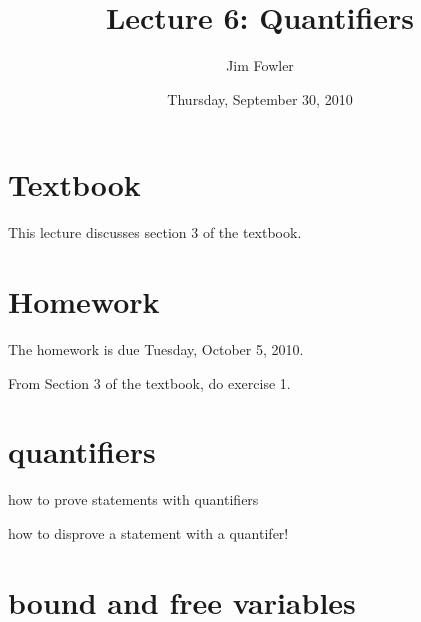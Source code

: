\documentclass[12pt]{handout}
\title{Lecture 6: Quantifiers}
\author{Jim Fowler}
\date{Thursday, September 30, 2010}
\begin{document}
\maketitle

\section*{Textbook}

This lecture discusses section 3 of the textbook.

\section*{Homework} 

The homework is due Tuesday, October  5, 2010.

From Section 3 of the textbook, do exercise 1.

\section*{quantifiers}

how to prove statements with quantifiers

how to disprove a statement with a quantifer!

\section*{bound and free variables}
\end{document}

